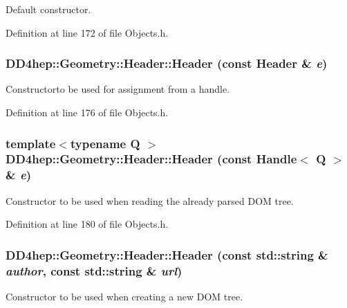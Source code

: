 Default constructor. 

Definition at line 172 of file Objects.h.\hypertarget{class_d_d4hep_1_1_geometry_1_1_header_a613572c6f7759e5758865fd622fc54d7}{
\subsubsection[{Header}]{\setlength{\rightskip}{0pt plus 5cm}DD4hep::Geometry::Header::Header (const {\bf Header} \& {\em e})}}
\label{class_d_d4hep_1_1_geometry_1_1_header_a613572c6f7759e5758865fd622fc54d7}


Constructorto be used for assignment from a handle. 

Definition at line 176 of file Objects.h.\hypertarget{class_d_d4hep_1_1_geometry_1_1_header_af0d0b82d83d933705b185c5908b3b738}{
\subsubsection[{Header}]{\setlength{\rightskip}{0pt plus 5cm}template$<$typename Q $>$ DD4hep::Geometry::Header::Header (const {\bf Handle}$<$ Q $>$ \& {\em e})}}
\label{class_d_d4hep_1_1_geometry_1_1_header_af0d0b82d83d933705b185c5908b3b738}


Constructor to be used when reading the already parsed DOM tree. 

Definition at line 180 of file Objects.h.\hypertarget{class_d_d4hep_1_1_geometry_1_1_header_ad5ea22234771c462b3202ee97d3b0bba}{
\subsubsection[{Header}]{\setlength{\rightskip}{0pt plus 5cm}DD4hep::Geometry::Header::Header (const std::string \& {\em author}, \/  const std::string \& {\em url})}}
\label{class_d_d4hep_1_1_geometry_1_1_header_ad5ea22234771c462b3202ee97d3b0bba}


Constructor to be used when creating a new DOM tree. 

